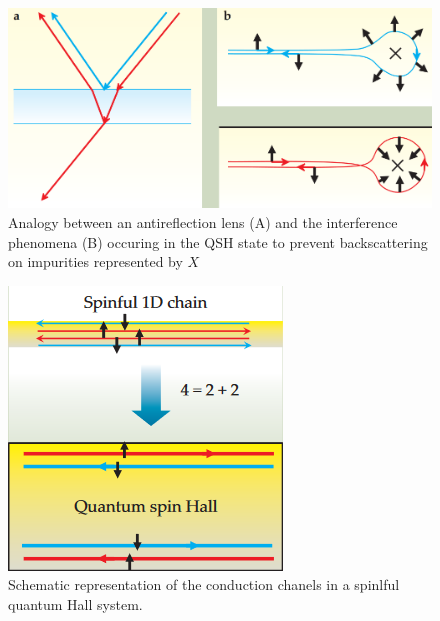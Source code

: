 \begin{figure}
    \includegraphics[scale = 0.7]{sections/visuel/lens.png}
    \caption{Analogy between an antireflection lens (A) and the interference phenomena (B) occuring in the QSH state to prevent backscattering on impurities represented by $X$ \cite{qi_quantum_2010}}
    \label{lens}
\end{figure}



\begin{figure}[h!]
    \includegraphics[scale = 0.7]{sections/visuel/spinful.png}
    \caption{Schematic representation of the conduction chanels in a spinlful quantum Hall system.}
    \label{spinful}
\end{figure}

